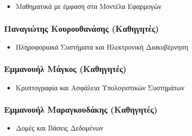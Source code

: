 \documentclass[
]{article}
\begin{document}
\begin{itemize}
\item
  Μαθηματικά με έμφαση στα Μοντέλα Εφαρμογών
\end{itemize}

\hypertarget{ux3c0ux3b1ux3bdux3b1ux3b3ux3b9ux3ceux3c4ux3b7ux3c2-ux3baux3bfux3c5ux3c1ux3bfux3c5ux3b8ux3b1ux3bdux3acux3c3ux3b7ux3c2-ux3baux3b1ux3b8ux3b7ux3b3ux3b7ux3c4ux3adux3c2}{%
\subsubsection{Παναγιώτης Κουρουθανάσης
(Καθηγητές)}\label{ux3c0ux3b1ux3bdux3b1ux3b3ux3b9ux3ceux3c4ux3b7ux3c2-ux3baux3bfux3c5ux3c1ux3bfux3c5ux3b8ux3b1ux3bdux3acux3c3ux3b7ux3c2-ux3baux3b1ux3b8ux3b7ux3b3ux3b7ux3c4ux3adux3c2}}

\begin{itemize}
\item
  Πληροφοριακά Συστήματα και Ηλεκτρονική Διακυβέρνηση
\end{itemize}

\hypertarget{ux3b5ux3bcux3bcux3b1ux3bdux3bfux3c5ux3aeux3bb-ux3bcux3acux3b3ux3baux3bfux3c2-ux3baux3b1ux3b8ux3b7ux3b3ux3b7ux3c4ux3adux3c2}{%
\subsubsection{Εμμανουήλ Μάγκος
(Καθηγητές)}\label{ux3b5ux3bcux3bcux3b1ux3bdux3bfux3c5ux3aeux3bb-ux3bcux3acux3b3ux3baux3bfux3c2-ux3baux3b1ux3b8ux3b7ux3b3ux3b7ux3c4ux3adux3c2}}

\begin{itemize}
\item
  Κρυπτογραφία και Ασφάλεια Υπολογιστικών Συστημάτων
\end{itemize}

\hypertarget{ux3b5ux3bcux3bcux3b1ux3bdux3bfux3c5ux3aeux3bb-ux3bcux3b1ux3c1ux3b1ux3b3ux3baux3bfux3c5ux3b4ux3acux3baux3b7ux3c2-ux3baux3b1ux3b8ux3b7ux3b3ux3b7ux3c4ux3adux3c2}{%
\subsubsection{Εμμανουήλ Μαραγκουδάκης
(Καθηγητές)}\label{ux3b5ux3bcux3bcux3b1ux3bdux3bfux3c5ux3aeux3bb-ux3bcux3b1ux3c1ux3b1ux3b3ux3baux3bfux3c5ux3b4ux3acux3baux3b7ux3c2-ux3baux3b1ux3b8ux3b7ux3b3ux3b7ux3c4ux3adux3c2}}

\begin{itemize}
\item
  Δομές και Βάσεις Δεδομένων
\end{itemize}
\end{document}
